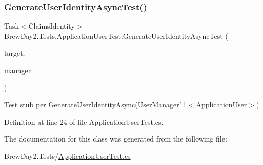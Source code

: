 \subsubsection{\texorpdfstring{Generate\+User\+Identity\+Async\+Test()}{GenerateUserIdentityAsyncTest()}}
{\footnotesize\ttfamily Task$<$Claims\+Identity$>$ Brew\+Day2.\+Tests.\+Application\+User\+Test.\+Generate\+User\+Identity\+Async\+Test (\begin{DoxyParamCaption}\item[{\mbox{[}\+Pex\+Assume\+Under\+Test\mbox{]} \mbox{\hyperlink{class_brew_day2_1_1_models_1_1_application_user}{Application\+User}}}]{target,  }\item[{User\+Manager$<$ \mbox{\hyperlink{class_brew_day2_1_1_models_1_1_application_user}{Application\+User}} $>$}]{manager }\end{DoxyParamCaption})}



Test stub per Generate\+User\+Identity\+Async(User\+Manager\`{}1$<$Application\+User$>$)



Definition at line 24 of file Application\+User\+Test.\+cs.



The documentation for this class was generated from the following file\+:\begin{DoxyCompactItemize}
\item 
Brew\+Day2.\+Tests/\mbox{\hyperlink{_application_user_test_8cs}{Application\+User\+Test.\+cs}}\end{DoxyCompactItemize}
